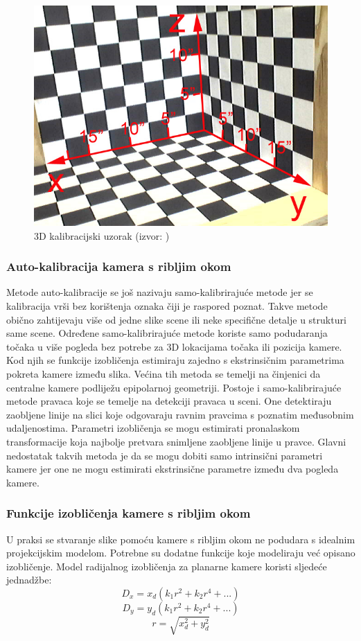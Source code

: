 \documentclass[../seminar.tex]{subfiles}
\begin{document}
\begin{figure}[ht!]
  \centering
    \includegraphics[width=.5\textwidth]{img_006_calib_3D.png}
   \caption{3D kalibracijski uzorak (izvor: \cite{Kashyap})}
  \label{fig: calib_3D}
\end{figure}
 
\subsubsection{Auto-kalibracija kamera s ribljim okom} 
 
Metode auto-kalibracije se još nazivaju samo-kalibrirajuće metode  jer se kalibracija vrši bez korištenja oznaka čiji je raspored poznat. Takve metode obično zahtijevaju više od jedne slike scene ili neke specifične detalje u strukturi same scene. Određene samo-kalibrirajuće metode koriste samo podudaranja točaka u više pogleda bez potrebe za 3D lokacijama točaka ili pozicija kamere. Kod njih se funkcije izobličenja estimiraju zajedno s ekstrinsičnim parametrima pokreta kamere između slika. Većina tih metoda se temelji na činjenici da centralne kamere podliježu epipolarnoj geometriji. Postoje i samo-kalibrirajuće metode pravaca koje se temelje na detekciji pravaca u sceni. 
One detektiraju zaobljene linije na slici koje odgovaraju ravnim pravcima s poznatim međusobnim udaljenostima. Parametri izobličenja se mogu estimirati pronalaskom transformacije koja najbolje pretvara snimljene zaobljene linije u pravce.  Glavni nedostatak takvih metoda je da se mogu dobiti samo intrinsični parametri kamere jer one ne mogu estimirati ekstrinsične parametre između dva pogleda kamere.
 
\subsubsection{Funkcije izobličenja kamere s ribljim okom}

U praksi se stvaranje slike pomoću kamere s ribljim okom ne podudara s idealnim projekcijskim modelom. Potrebne su dodatne funkcije koje modeliraju već opisano izobličenje. Model radijalnog izobličenja za planarne kamere koristi sljedeće jednadžbe:
\begin{equation}
\label{eq: eq_D_x}
D_x = x_d(k_1r^2 + k_2r^4 + ...)
\end{equation}
\begin{equation}
\label{eq: eq_D_y}
D_y = y_d(k_1r^2 + k_2r^4 + ...)
\end{equation}
\begin{equation}
r = \sqrt{x_d^2 + y_d^2}
\end{equation}
\end{document}
